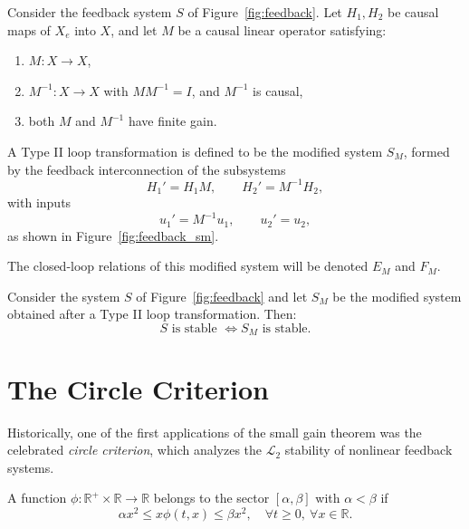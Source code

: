 \begin{definition}
Consider the feedback system $S$ of Figure~\ref{fig:feedback}.  
Let $H_1, H_2$ be causal maps of $X_e$ into $X$, and let $M$ be a causal linear operator satisfying:  

\begin{enumerate}
    \item $M: X \to X$,  
    \item $M^{-1}: X \to X$ with $MM^{-1}=I$, and $M^{-1}$ is causal,  
    \item both $M$ and $M^{-1}$ have finite gain.  
\end{enumerate}

A Type II loop transformation is defined to be the modified system $S_M$, formed by the feedback interconnection of the subsystems
\begin{equation}
H_1' = H_1 M, \qquad H_2' = M^{-1} H_2,
\end{equation}
with inputs
\begin{equation}
u_1' = M^{-1}u_1, \qquad u_2' = u_2,
\end{equation}
as shown in Figure~\ref{fig:feedback_sm}.  

The closed-loop relations of this modified system will be denoted $E_M$ and $F_M$.
\end{definition}

\begin{theorem}
Consider the system $S$ of Figure~\ref{fig:feedback} and let $S_M$ be the modified system obtained after a Type II loop transformation. Then:
\begin{equation}
S \text{ is stable } \iff S_M \text{ is stable.}
\end{equation}
\end{theorem}

\section{The Circle Criterion}

Historically, one of the first applications of the small gain theorem was the celebrated \emph{circle criterion}, which analyzes the $\mathcal{L}_2$ stability of nonlinear feedback systems.  

\begin{definition}
A function $\phi:\mathbb{R}^+\times\mathbb{R}\to\mathbb{R}$ belongs to the sector $[\alpha,\beta]$ with $\alpha<\beta$ if
\begin{equation}
    \alpha x^2 \leq x\phi(t,x) \leq \beta x^2, \quad \forall t\geq 0,\ \forall x\in\mathbb{R}.
\end{equation}
\end{definition}

